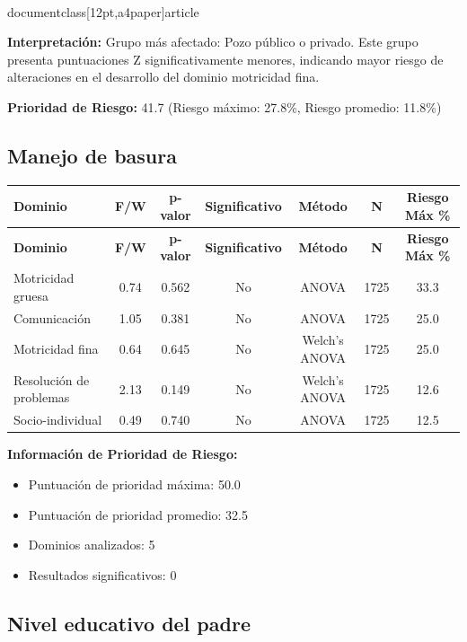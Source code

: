 \\documentclass[12pt,a4paper]{article}
\begin{document}
\textbf{Interpretación:} Grupo más afectado: Pozo público o privado. Este grupo presenta puntuaciones Z significativamente menores, indicando mayor riesgo de alteraciones en el desarrollo del dominio motricidad fina.

\textbf{Prioridad de Riesgo:} 41.7 (Riesgo máximo: 27.8\%, Riesgo promedio: 11.8\%)


\vspace{0.5cm}


\subsection{Manejo de basura}


\begin{longtable}{|l|c|c|c|c|c|c|}
\hline
\textbf{Dominio} & \textbf{F/W} & \textbf{p-valor} & \textbf{Significativo} & \textbf{Método} & \textbf{N} & \textbf{Riesgo Máx \%} \\
\hline
\endfirsthead

\hline
\textbf{Dominio} & \textbf{F/W} & \textbf{p-valor} & \textbf{Significativo} & \textbf{Método} & \textbf{N} & \textbf{Riesgo Máx \%} \\
\hline
\endhead

\hline
\endfoot

\hline
\endlastfoot

Motricidad gruesa & 0.74 & 0.562 & No & ANOVA & 1725 & 33.3 \\
Comunicación & 1.05 & 0.381 & No & ANOVA & 1725 & 25.0 \\
Motricidad fina & 0.64 & 0.645 & No & Welch's ANOVA & 1725 & 25.0 \\
Resolución de problemas & 2.13 & 0.149 & No & Welch's ANOVA & 1725 & 12.6 \\
Socio-individual & 0.49 & 0.740 & No & ANOVA & 1725 & 12.5 \\

\end{longtable}


\textbf{Información de Prioridad de Riesgo:}
\begin{itemize}
\item Puntuación de prioridad máxima: 50.0
\item Puntuación de prioridad promedio: 32.5
\item Dominios analizados: 5
\item Resultados significativos: 0
\end{itemize}


\subsection{Nivel educativo del padre}
\end{document}
